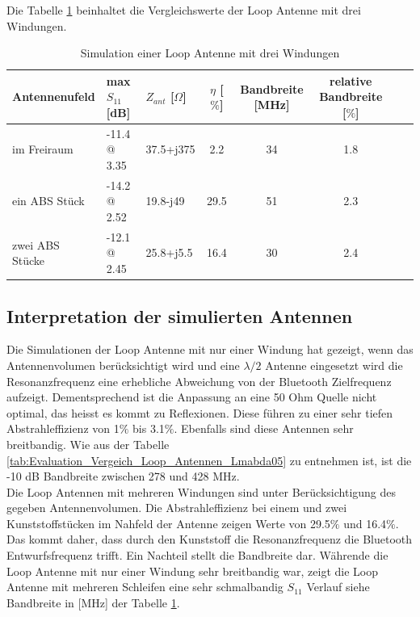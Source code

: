 Die Tabelle \ref{tab:Evaluation_Vergeich_Loop_Antennen_Coil} beinhaltet die Vergleichswerte der Loop Antenne mit drei Windungen.
\begin{table}[!h]
 \centering
 \begin{tabular}{p{3cm} p{3cm} l c c c c r} 
 \toprule 
 Antennenufeld & max $S_{11}$ [dB]		& $Z_{ant}$ [$\Omega$] 	& $\eta$ [$\%$] & Bandbreite [MHz] & relative Bandbreite [$\%$]\\ 
 \midrule
im Freiraum 		&	-11.4 @ 3.35		& 	37.5+j375	& 	2.2		& 34		& 1.8\\ 					 		
ein ABS Stück 	& -14.2 @ 2.52 		&	19.8-j49		&	29.5		& 51	 	& 2.3\\
zwei ABS Stücke 	& -12.1 @ 2.45 		&	25.8+j5.5	&	16.4		& 30 	& 2.4\\
 \bottomrule
 \end{tabular}
 \caption{Simulation einer Loop Antenne mit drei Windungen }
 \label{tab:Evaluation_Vergeich_Loop_Antennen_Coil}
\end{table}

\subsection{Interpretation der simulierten Antennen}
Die Simulationen der Loop Antenne mit nur einer Windung hat gezeigt, wenn das Antennenvolumen berücksichtigt wird und eine $\lambda/2$ Antenne eingesetzt wird die Resonanzfrequenz eine erhebliche Abweichung von der Bluetooth Zielfrequenz aufzeigt. Dementsprechend ist die Anpassung an eine 50 Ohm Quelle nicht optimal, das heisst es kommt zu Reflexionen. Diese führen zu einer sehr tiefen  Abstrahleffizienz von 1$\%$ bis 3.1$\%$. Ebenfalls sind diese Antennen sehr breitbandig. Wie aus der Tabelle \ref{tab:Evaluation_Vergeich_Loop_Antennen_Lmabda05} zu entnehmen ist, ist die -10 dB Bandbreite zwischen 278 und 428 MHz.\\
Die Loop Antennen mit mehreren Windungen sind unter Berücksichtigung des gegeben Antennenvolumen. Die Abstrahleffizienz bei einem und zwei Kunststoffstücken im Nahfeld der Antenne zeigen Werte von 29.5$\%$ und 16.4$\%$. Das kommt daher, dass durch den Kunststoff die Resonanzfrequenz die Bluetooth Entwurfsfrequenz trifft. Ein Nachteil stellt die Bandbreite dar. Währende die Loop Antenne mit nur einer Windung sehr breitbandig war, zeigt die Loop Antenne mit mehreren Schleifen eine sehr schmalbandig $S_{11}$ Verlauf siehe Bandbreite in [MHz] der Tabelle \ref{tab:Evaluation_Vergeich_Loop_Antennen_Coil}.



